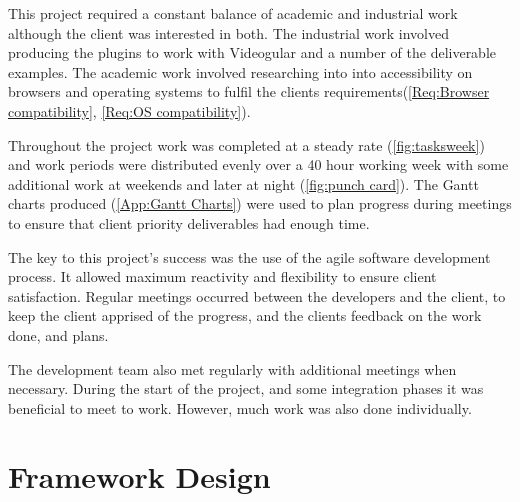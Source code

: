 This project required a constant balance of academic and industrial work although the client was interested in both. The industrial work involved producing the plugins to work with \gls{Videogular} and a number of the deliverable examples. The academic work involved researching into into accessibility on browsers and operating systems to fulfil the clients requirements(\cref{Req:Browser compatibility}, \cref{Req:OS compatibility}).

Throughout the project work was completed at a steady rate (\autoref{fig:tasksweek}) and work periods were distributed evenly over a 40 hour working week with some additional work at weekends and later at night (\autoref{fig:punch card}). The Gantt charts produced (\cref{App:Gantt Charts}) were used to plan progress during meetings to ensure that client priority deliverables had enough time.

The key to this project's success was the use of the agile software development
process. It allowed maximum reactivity and flexibility to ensure client
satisfaction. Regular meetings occurred between the developers and the client,
to keep the client apprised of the progress, and the clients feedback on the
work done, and plans.

The development team also met regularly with additional meetings when
necessary. During the start of the project, and some integration phases it was
beneficial to meet to work. However, much work was also done individually.









\section{Framework Design}

